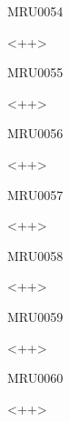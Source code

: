 \documentclass{article}
\begin{document}
\begin{corrige}{MRU0054}

<++>

\end{corrige}%


\begin{corrige}{MRU0055}

<++>

\end{corrige}%


\begin{corrige}{MRU0056}

<++>

\end{corrige}%


\begin{corrige}{MRU0057}

<++>

\end{corrige}%


\begin{corrige}{MRU0058}

<++>

\end{corrige}%


\begin{corrige}{MRU0059}

<++>

\end{corrige}%


\begin{corrige}{MRU0060}

<++>

\end{corrige}%
\end{document}
